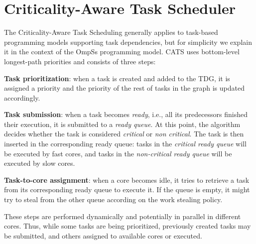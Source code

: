 
\section{Criticality-Aware Task Scheduler}
\label{sec.scheduling.cats}
The Criticality-Aware Task Scheduling generally applies to task-based programming models supporting task dependencies, but for simplicity we explain it in the context of the OmpSs programming model.
CATS uses bottom-level longest-path priorities and consists of three steps:

\textbf{Task prioritization}: when a task is created and added to the TDG, it is assigned a priority and the priority of the rest of tasks in the graph is updated accordingly.

\textbf{Task submission}: when a task becomes \textit{ready}, i.e., all its predecessors finished their execution, it is submitted to a \textit{ready queue}. At this point, the algorithm decides whether the task is considered \textit{critical} or \textit{non critical}. The task is then inserted in the corresponding ready queue: tasks in the \textit{critical ready queue} will be executed by fast cores, and tasks in the \textit{non-critical ready queue} will be executed by slow cores.

\textbf{Task-to-core assignment}: when a core becomes idle, it tries to retrieve a task from its corresponding ready queue to execute it. If the queue is empty, it might try to steal from the other queue according on the work stealing policy. %

These steps are performed dynamically and potentially in parallel in different cores. Thus, while some tasks are being prioritized, previously created tasks may be submitted, and others assigned to available cores or executed.

